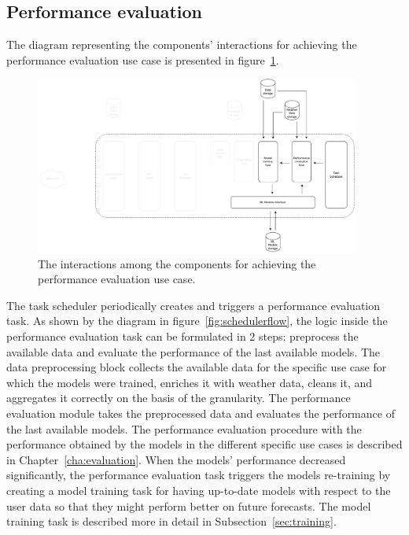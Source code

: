 \vspace{0.1 cm}
\subsection{Performance evaluation}
\label{sec:scheduler}
\vspace{0.1 cm}

The diagram representing the components' interactions for achieving the performance evaluation use case is presented in figure~\ref{fig:schedulerinteractions}.

\begin{figure}[H]
\centering
\includegraphics[width=0.95\textwidth]{images/architecture_scheduler_interactions}
\caption{The interactions among the components for achieving the performance evaluation use case.}
\label{fig:schedulerinteractions}
\end{figure}

The task scheduler periodically creates and triggers a performance evaluation task.
As shown by the diagram in figure~\ref{fig:schedulerflow}, the logic inside the performance evaluation task can be formulated in 2 steps: preprocess the available data and evaluate the performance of the last available models.
The data preprocessing block collects the available data for the specific use case for which the models were trained, enriches it with weather data, cleans it, and aggregates it correctly on the basis of the granularity.
The performance evaluation module takes the preprocessed data and evaluates the performance of the last available models.
The performance evaluation procedure with the performance obtained by the models in the different specific use cases is described in Chapter~\ref{cha:evaluation}.
When the models’ performance decreased significantly, the performance evaluation task triggers the models re-training by creating a model training task for having up-to-date models with respect to the user data so that they might perform better on future forecasts.
The model training task is described more in detail in Subsection~\ref{sec:training}.


